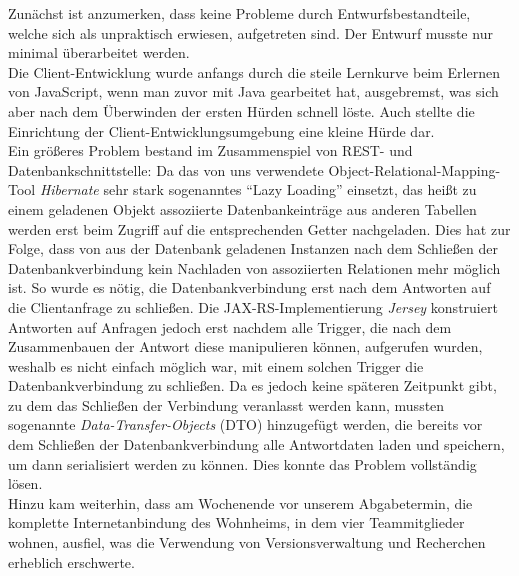  Zunächst ist anzumerken, dass keine Probleme durch Entwurfsbestandteile, welche sich als unpraktisch erwiesen, aufgetreten sind. Der Entwurf musste nur minimal überarbeitet werden.\\
 Die Client-Entwicklung wurde anfangs durch die steile Lernkurve beim Erlernen von JavaScript, wenn man zuvor mit Java gearbeitet hat, ausgebremst, was sich aber nach dem Überwinden der ersten Hürden schnell löste. Auch stellte die Einrichtung der Client-Entwicklungsumgebung eine kleine Hürde dar.\\
 Ein größeres Problem bestand im Zusammenspiel von REST- und Datenbankschnittstelle: Da das von uns verwendete Object-Relational-Mapping-Tool \textit{Hibernate} sehr stark sogenanntes \enquote{Lazy Loading} einsetzt, das heißt zu einem geladenen Objekt assoziierte Datenbankeinträge aus anderen Tabellen werden erst beim Zugriff auf die entsprechenden Getter nachgeladen. Dies hat zur Folge, dass von aus der Datenbank geladenen Instanzen nach dem Schließen der Datenbankverbindung kein Nachladen von assoziierten Relationen mehr möglich ist. So wurde es nötig, die Datenbankverbindung erst nach dem Antworten auf die Clientanfrage zu schließen. Die JAX-RS-Implementierung \textit{Jersey} konstruiert Antworten auf Anfragen jedoch erst nachdem alle Trigger, die nach dem Zusammenbauen der Antwort diese manipulieren können, aufgerufen wurden, weshalb es nicht einfach möglich war, mit einem solchen Trigger die Datenbankverbindung zu schließen. Da es jedoch keine späteren Zeitpunkt gibt, zu dem das Schließen der Verbindung veranlasst werden kann, mussten sogenannte \textit{Data-Transfer-Objects} (DTO) hinzugefügt werden, die bereits vor dem Schließen der Datenbankverbindung alle Antwortdaten laden und speichern, um dann serialisiert werden zu können.
 Dies konnte das Problem vollständig lösen. \\
 Hinzu kam weiterhin, dass am Wochenende vor unserem Abgabetermin, die komplette Internetanbindung des Wohnheims, in dem vier Teammitglieder wohnen, ausfiel, was die Verwendung von Versionsverwaltung und Recherchen erheblich erschwerte. \\
 